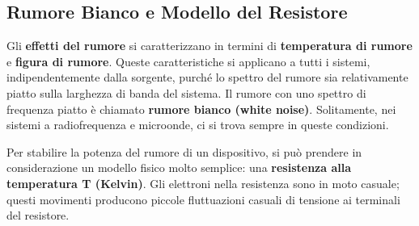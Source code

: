 \documentclass[openany,a4paper,12pt]{book}
\begin{document}
\begin{figure}[H]
\end{figure}



\subsection*{Rumore Bianco e Modello del Resistore}

Gli \textbf{effetti del rumore} si caratterizzano in termini di \textbf{temperatura di rumore} e \textbf{figura di rumore}. Queste caratteristiche si applicano a tutti i sistemi, indipendentemente dalla sorgente, purché lo spettro del rumore sia relativamente piatto sulla larghezza di banda del sistema. 
Il rumore con uno spettro di frequenza piatto è chiamato \textbf{rumore bianco (white noise)}. Solitamente, nei sistemi a radiofrequenza e microonde, ci si trova sempre in queste condizioni.

Per stabilire la potenza del rumore di un dispositivo, si può prendere in considerazione un modello fisico molto semplice: una \textbf{resistenza alla temperatura T (Kelvin)}. Gli elettroni nella resistenza sono in moto casuale; questi movimenti producono piccole fluttuazioni casuali di tensione ai terminali del resistore.
\end{document}
